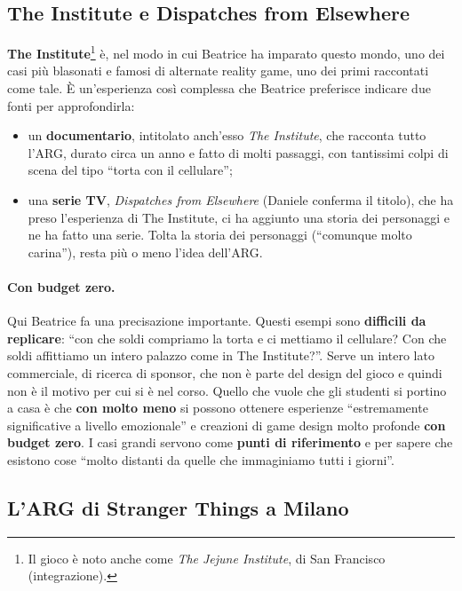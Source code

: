 \subsection{The Institute e Dispatches from Elsewhere}

\textbf{The Institute}\footnote{Il gioco è noto anche come \emph{The Jejune
Institute}, di San Francisco (integrazione).} è, nel modo in cui Beatrice ha
imparato questo mondo, uno dei casi più blasonati e famosi di alternate reality
game, uno dei primi raccontati come tale. È un'esperienza così complessa che
Beatrice preferisce indicare due fonti per approfondirla:
\begin{itemize}
  \item un \textbf{documentario}, intitolato anch'esso \emph{The Institute}, che
        racconta tutto l'ARG, durato circa un anno e fatto di molti passaggi, con
        tantissimi colpi di scena del tipo ``torta con il cellulare'';
  \item una \textbf{serie TV}, \emph{Dispatches from Elsewhere} (Daniele
        conferma il titolo), che ha preso l'esperienza di The Institute, ci ha
        aggiunto una storia dei personaggi e ne ha fatto una serie. Tolta la
        storia dei personaggi (``comunque molto carina''), resta più o meno
        l'idea dell'ARG.
\end{itemize}

\paragraph{Con budget zero.} Qui Beatrice fa una precisazione importante. Questi
esempi sono \textbf{difficili da replicare}: ``con che soldi compriamo la torta e
ci mettiamo il cellulare? Con che soldi affittiamo un intero palazzo come in The
Institute?''. Serve un intero lato commerciale, di ricerca di sponsor, che non è
parte del design del gioco e quindi non è il motivo per cui si è nel corso.
Quello che vuole che gli studenti si portino a casa è che \textbf{con molto meno}
si possono ottenere esperienze ``estremamente significative a livello
emozionale'' e creazioni di game design molto profonde \textbf{con budget zero}.
I casi grandi servono come \textbf{punti di riferimento} e per sapere che
esistono cose ``molto distanti da quelle che immaginiamo tutti i giorni''.

\subsection{L'ARG di Stranger Things a Milano}


